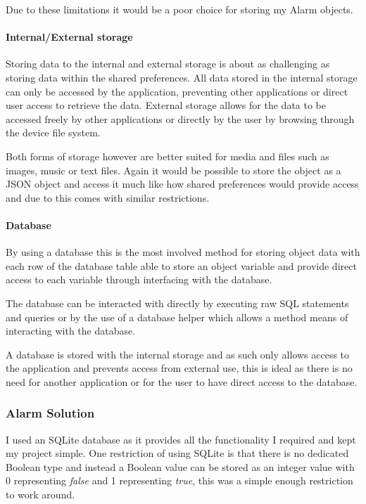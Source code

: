 Due to these limitations it would be a poor choice for storing my Alarm
objects.

\paragraph{Internal/External storage}\label{internalexternal-storage}

Storing data to the internal and external storage is about as
challenging as storing data within the shared preferences. All data
stored in the internal storage can only be accessed by the application,
preventing other applications or direct user access to retrieve the
data. External storage allows for the data to be accessed freely by
other applications or directly by the user by browsing through the
device file system.

Both forms of storage however are better suited for media and files such
as images, music or text files. Again it would be possible to store the
object as a JSON object and access it much like how shared preferences
would provide access and due to this comes with similar restrictions.

\paragraph{Database}\label{database}

By using a database this is the most involved method for storing object
data with each row of the database table able to store an object
variable and provide direct access to each variable through interfacing
with the database.

The database can be interacted with directly by executing raw SQL
statements and queries or by the use of a database helper which allows a
method means of interacting with the database.

A database is stored with the internal storage and as such only allows
access to the application and prevents access from external use, this is
ideal as there is no need for another application or for the user to
have direct access to the database.

\subsubsection{Alarm Solution}\label{alarm-solution}

I used an SQLite database as it provides all the functionality I
required and kept my project simple. One restriction of using SQLite is
that there is no dedicated Boolean type and instead a Boolean value can
be stored as an integer value with 0 representing \emph{false} and 1
representing \emph{true}, this was a simple enough restriction to work
around.

